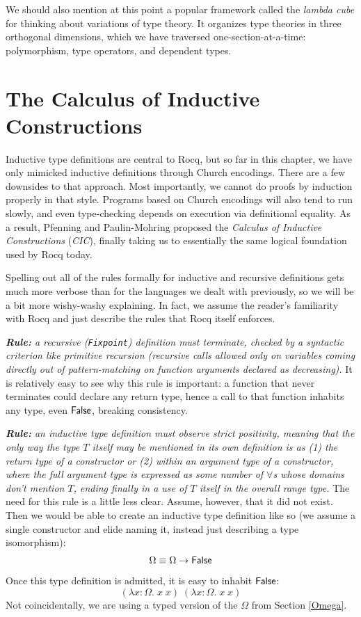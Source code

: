 \documentclass{amsbook}
\theoremstyle{definition}
\theoremstyle{remark}
\numberwithin{section}{chapter}
\numberwithin{equation}{chapter}
\begin{document}
We should also mention at this point a popular framework called the \emph{lambda cube} for thinking about variations of type theory.
It organizes type theories in three orthogonal dimensions, which we have traversed one-section-at-a-time: polymorphism, type operators, and dependent types.

\section{The Calculus of Inductive Constructions}

Inductive type definitions are central to Rocq, but so far in this chapter, we have only mimicked inductive definitions through Church encodings.
There are a few downsides to that approach.
Most importantly, we cannot do proofs by induction properly in that style.
Programs based on Church encodings will also tend to run slowly, and even type-checking depends on execution via definitional equality.
As a result, Pfenning and Paulin-Mohring proposed the \emph{Calculus of Inductive Constructions} (\emph{CIC}), finally taking us to essentially the same logical foundation used by Rocq today.

Spelling out all of the rules formally for inductive and recursive definitions gets much more verbose than for the languages we dealt with previously, so we will be a bit more wishy-washy explaining.
In fact, we assume the reader's familiarity with Rocq and just describe the rules that Rocq itself enforces.

\emph{\textbf{Rule:} a recursive (\texttt{Fixpoint}) definition must terminate, checked by a syntactic criterion like primitive recursion (recursive calls allowed only on variables coming directly out of pattern-matching on function arguments declared as decreasing).}
It is relatively easy to see why this rule is important: a function that never terminates could declare any return type, hence a call to that function inhabits any type, even $\mathsf{False}$, breaking consistency.

\emph{\textbf{Rule:} an inductive type definition must observe \emph{strict positivity}, meaning that the only way the type $T$ itself may be mentioned in its own definition is as (1) the return type of a constructor or (2) within an argument type of a constructor, where the full argument type is expressed as some number of $\forall$s whose domains don't mention $T$, ending finally in a use of $T$ itself in the overall range type.}
The need for this rule is a little less clear.
Assume, however, that it did not exist.
Then we would be able to create an inductive type definition like so (we assume a single constructor and elide naming it, instead just describing a type isomorphism):
$$\Omega \equiv \Omega \to \mathsf{False}$$
Once this type definition is admitted, it is easy to inhabit $\mathsf{False}$:
$$(\lambda x : \Omega. \; x \; x) \; (\lambda x : \Omega. \; x \; x)$$
Not coincidentally, we are using a typed version of the $\Omega$ from Section \ref{Omega}.
\end{document}
